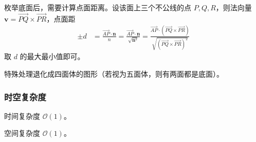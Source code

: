 				枚举底面后，需要计算点面距离。设该面上三个不公线的点 $P, Q, R$，则法向量 $\mathbf{v} = \overrightarrow{PQ} \times  \overrightarrow{PR}$，点面距
				\begin{align}
					\pm d & = \frac{\overrightarrow{AP} \cdot \mathbf{n}}{n} =  \frac{\overrightarrow{AP} \cdot \mathbf{n}}{\sqrt{ {\mathbf{n}}^2 }}  = \frac{\overrightarrow{AP} \cdot \left(\overrightarrow{PQ} \times  \overrightarrow{PR}\right)}{\sqrt{ {\left(\overrightarrow{PQ} \times  \overrightarrow{PR}\right)}^2 }}
				\end{align}
				取 $d$ 的最大最小值即可。
				
				特殊处理退化成四面体的图形（若视为五面体，则有两面都是底面）。
			\subsubsection{时空复杂度}
				时间复杂度 $\mathcal{O}\left(1 \right)$。
				
				空间复杂度 $\mathcal{O}\left(1 \right)$。
		\newpage